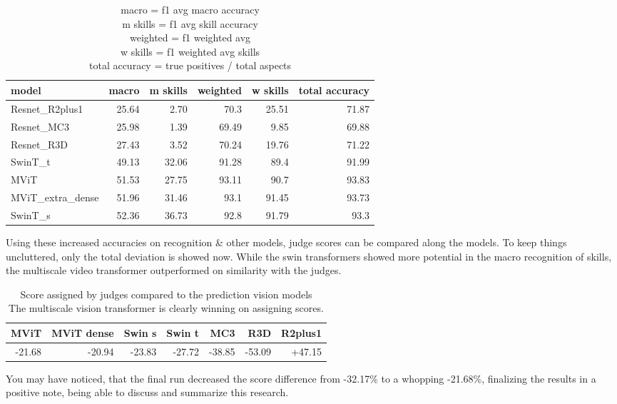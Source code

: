 \begin{table}[h!]
    \begin{tabular}{|l|r|r|r|r|r|}
        \hline model &  macro & m skills & weighted & w skills & total accuracy \\ \hline
        Resnet\_R2plus1	    & 25.64 &	2.70 &	70.3	& 25.51	& 71.87 \\
        Resnet\_MC3	        & 25.98 &	1.39 &	69.49	& 9.85	& 69.88 \\
        Resnet\_R3D	        & 27.43 &	3.52 &	70.24	& 19.76	& 71.22 \\
        SwinT\_t	        & 49.13 &	32.06 &	91.28	& 89.4	& 91.99 \\
        MViT	            & 51.53 &	27.75 &	93.11	& 90.7	& 93.83 \\
        MViT\_extra\_dense	& 51.96 &	31.46 &	93.1	& 91.45	& 93.73 \\
        SwinT\_s	        & 52.36 &	36.73 &	92.8	& 91.79	& 93.3  \\ \hline
\end{tabular}
\caption[Skill recognition comparison on multiple models]{
    macro = f1 avg macro accuracy \\
    m skills = f1 avg skill accuracy \\
    weighted = f1 weighted avg \\
    w skills = f1 weighted avg skills \\
    total accuracy = true positives / total aspects
}
\label{tbl:skill-recognition-model-comparison}
\end{table}


Using these increased accuracies on recognition \& other models, judge scores can be compared along the models.
To keep things uncluttered, only the total deviation is showed now. While the swin transformers showed more potential in the macro recognition of skills, the multiscale video transformer outperformed on similarity with the judges.

\begin{table}[h!]
    \begin{tabular}{|r|r|r|r|r|r|r|}
        \hline
        MViT   & MViT dense  & Swin s & Swin t & MC3    & R3D   & R2plus1 \\ \hline
        -21.68 & -20.94      & -23.83 & -27.72 & -38.85 &-53.09 & +47.15  \\ \hline
    \end{tabular}
    \caption[Judge diff score compared to all models]{Score assigned by judges compared to the prediction vision models \\
    The multiscale vision transformer is clearly winning on assigning scores.}
    \label{tbl:judge-score-comparison}
\end{table}

You may have noticed, that the final run decreased the score difference from -32.17\% to a whopping -21.68\%, finalizing the results in a positive note, being able to discuss and summarize this research.